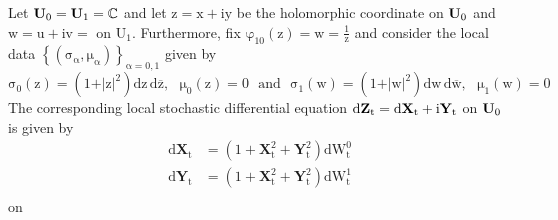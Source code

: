 \documentclass[10 pt,english]{smfart}
\newcommand{\Z}{{\bf{Z}_{\textrm{t}}}}
\newcommand{\Xt}{\mathrm{\mathbf{X}}_{t}}
\newcommand{\Yt}{\mathrm{\mathbf{Y}}_{t}}
\newcommand{\U}{{\bf{U}}}
\begin{document}
\begin{exem} Let $\mathrm{\U_{0}=\U_{1}=\mathbb{C}}$ and let $\mathrm{z=x+iy}$ be the holomorphic coordinate on $\mathrm{\U_{0}}$ and $\mathrm{w=u+iv=}$ on $\mathrm{U_{1}}$. Furthermore, fix $\mathrm{\varphi_{10}\left(z\right)=w=\frac{1}{z}}$ and consider the local data $\mathrm{\left\{(\sigma_{\alpha},\mu_{\alpha})\right\}_{\alpha=0,1}}$ given by
\begin{equation}
\mathrm{\sigma_{0}\left(z\right)=\left(1+\vert z\vert^2\right)dz\,d\overline{z},\,\,\,\,\mu_{0}(z)=0\,\,\,\, and\,\,\,\, \sigma_{1}\left(w\right)=\left(1+\vert w\vert^2\right)dw\,d\overline{w},\,\,\,\, \mu_{1}(w)=0}
\end{equation} The corresponding local stochastic differential equation $\mathrm{d\Z=d\Xt+i\Yt}$ on $\mathrm{\U_{0}}$ is given by 
\begin{equation}
\begin{split}
\mathrm{d\mathbf{X}_{t}}&=\mathrm{\left(1+\mathbf{X}_{t}^{2}+\mathbf{Y}_{t}^{2}\right)dW^{0}_{t}}\\
\mathrm{d\mathbf{Y}_{t}}&=\mathrm{\left(1+\mathbf{X}_{t}^{2}+\mathbf{Y}_{t}^{2}\right)dW^{1}_{t}}\\
\end{split}
\end{equation} on 

\end{exem}
\end{document}
